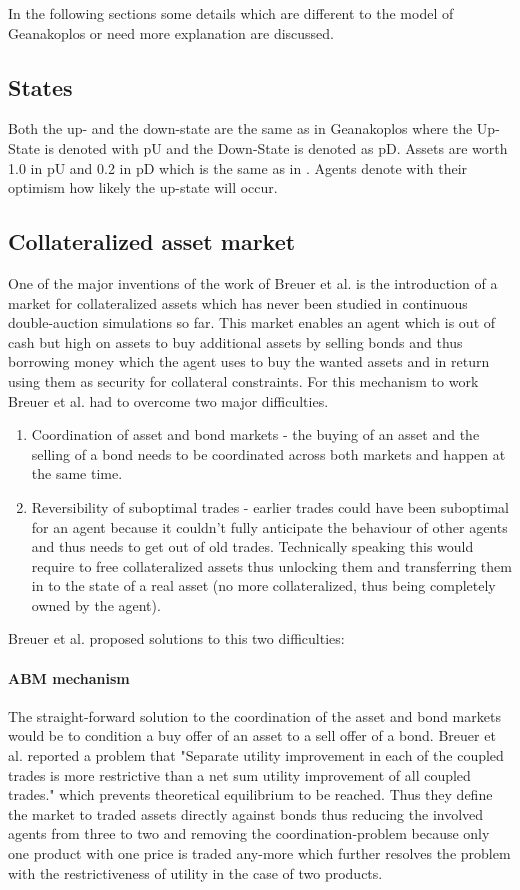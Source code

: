 \documentclass[../Bachelorarbeit.tex]{subfiles}
\begin{document}
In the following sections some details which are different to the model of Geanakoplos or need more explanation are discussed.

\subsection{States}
Both the up- and the down-state are the same as in Geanakoplos where the Up-State is denoted with pU and the Down-State is denoted as pD. Assets are worth 1.0 in pU and 0.2 in pD which is the same as in \cite{Geanakoplos2009}. Agents denote with their optimism how likely the up-state will occur.

\subsection{Collateralized asset market}
One of the major inventions of the work of Breuer et al. is the introduction of a market for collateralized assets which has never been studied in continuous double-auction simulations so far. This market enables an agent which is out of cash but high on assets to buy additional assets by selling bonds and thus borrowing money which the agent uses to buy the wanted assets and in return using them as security for collateral constraints. For this mechanism to work Breuer et al. had to overcome two major difficulties.

\begin{enumerate}
\item Coordination of asset and bond markets - the buying of an asset and the selling of a bond needs to be coordinated across both markets and happen at the same time.
\item Reversibility of suboptimal trades - earlier trades could have been suboptimal for an agent because it couldn't fully anticipate the behaviour of other agents and thus needs to get out of old trades. Technically speaking this would require to free collateralized assets thus unlocking them and transferring them in to the state of a real asset (no more collateralized, thus being completely owned by the agent).
\end{enumerate}

Breuer et al. proposed solutions to this two difficulties:
\paragraph{ABM mechanism}
The straight-forward solution to the coordination of the asset and bond markets would be to condition a buy offer of an asset to a sell offer of a bond. Breuer et al. reported a problem that "Separate utility improvement in each of the coupled trades is more restrictive than a net sum utility improvement of all coupled trades." which prevents theoretical equilibrium to be reached. Thus they define the market to traded assets directly against bonds thus reducing the involved agents from three to two and removing the coordination-problem because only one product with one price is traded any-more which further resolves the problem with the restrictiveness of utility in the case of two products.
\end{document}
